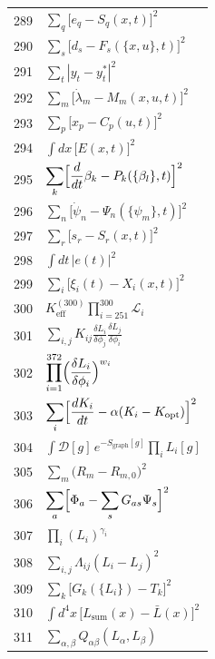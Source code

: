 \documentclass[11pt,a4paper]{article}
\begin{document}
\begin{longtable}{r p{}}
	289 & \(\displaystyle \sum_q\bigl[e_q - S_q(x,t)\bigr]^2\) \\
	290 & \(\displaystyle \sum_s\bigl[d_s - F_s(\{x,u\},t)\bigr]^2\) \\
	291 & \(\displaystyle \sum_t|y_t - y_t^*|^2\) \\
	292 & \(\displaystyle \sum_m\bigl[\dot\lambda_m - M_m(x,u,t)\bigr]^2\) \\
	293 & \(\displaystyle \sum_p\bigl[x_p - C_p(u,t)\bigr]^2\) \\
	294 & \(\displaystyle \int dx\,\bigl[E(x,t)\bigr]^2\) \\
	295 & \(\displaystyle \sum_k\Bigl[\frac{d}{dt}\beta_k - P_k(\{\beta_l\},t)\Bigr]^2\) \\
	296 & \(\displaystyle \sum_n\bigl[\dot\psi_n - \Psi_n(\{\psi_m\},t)\bigr]^2\) \\
	297 & \(\displaystyle \sum_r\bigl[s_r - S_r(x,t)\bigr]^2\) \\
	298 & \(\displaystyle \int dt\,|e(t)|^2\) \\
	299 & \(\displaystyle \sum_i\bigl[\xi_i(t) - X_i(x,t)\bigr]^2\) \\
	300 & \(\displaystyle K^{(300)}_{\mathrm{eff}}\prod_{i=251}^{300}\mathcal{L}_i\) \\
	301 & \(\displaystyle \sum_{i,j}K_{ij}\frac{\delta L_i}{\delta\phi_j}\frac{\delta L_j}{\delta\phi_i}\) \\
	302 & \(\displaystyle \prod_{i=1}^{372}\Bigl(\frac{\delta L_i}{\delta\phi_i}\Bigr)^{w_i}\) \\
	303 & \(\displaystyle \sum_i\Bigl[\frac{dK_i}{dt} - \alpha(K_i - K_{\text{opt}})\Bigr]^2\) \\
	304 & \(\displaystyle \int\mathcal{D}[g]\,e^{-S_{\text{graph}}[g]}\prod_i L_i[g]\) \\
	305 & \(\displaystyle \sum_m\bigl(R_m - R_{m,0}\bigr)^2\) \\
	306 & \(\displaystyle \sum_a\Bigl[\Phi_a - \sum_s G_{as}\Psi_s\Bigr]^2\) \\
	307 & \(\displaystyle \prod_i(L_i)^{\gamma_i}\) \\
	308 & \(\displaystyle \sum_{i,j}\Lambda_{ij}(L_i - L_j)^2\) \\
	309 & \(\displaystyle \sum_k\bigl[G_k(\{L_i\}) - T_k\bigr]^2\) \\
	310 & \(\displaystyle \int d^4x\,\bigl[L_{\text{sum}}(x) - \bar L(x)\bigr]^2\) \\
	311 & \(\displaystyle \sum_{\alpha,\beta}Q_{\alpha\beta}(L_\alpha,L_\beta)\) \\

\end{longtable}
\end{document}
